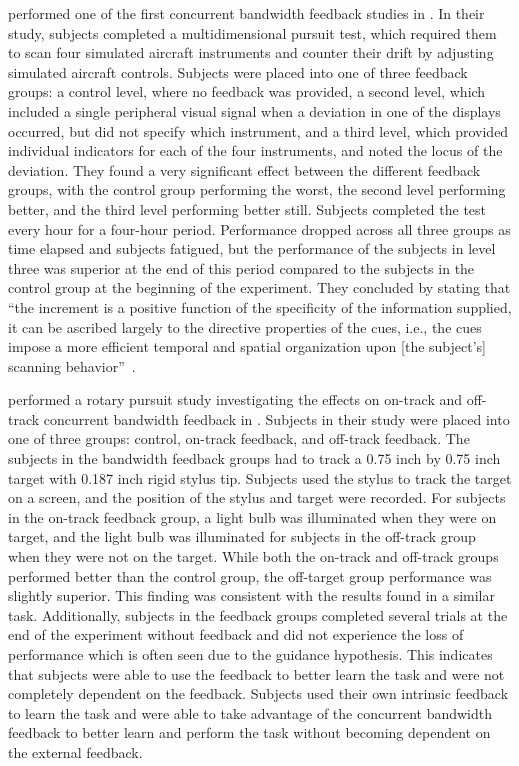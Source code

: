 \citeauthor{payne_effect_1955} performed one of the first concurrent bandwidth feedback studies in \citeyear{payne_effect_1955}.
In their study, subjects completed a multidimensional pursuit test, which required them to scan four simulated aircraft instruments and counter their drift by adjusting simulated aircraft controls.
Subjects were placed into one of three feedback groups: a control level, where no feedback was provided, a second level, which included a single peripheral visual signal when a deviation in one of the displays occurred, but did not specify which instrument, and a third level, which provided individual indicators for each of the four instruments, and noted the locus of the deviation.
They found a very significant effect between the different feedback groups, with the control group performing the worst, the second level performing better, and the third level performing better still.
Subjects completed the test every hour for a four-hour period.
Performance dropped across all three groups as time elapsed and subjects fatigued, but the performance of the subjects in level three was superior at the end of this period compared to the subjects in the control group at the beginning of the experiment.
They concluded by stating that ``the increment is a positive function of the specificity of the information supplied, it can be ascribed largely to the directive properties of the cues, i.e., the cues impose a more efficient temporal and spatial organization upon [the subject's] scanning behavior''~\citep{payne_effect_1955}.

\citeauthor{gordon_effect_1967} performed a rotary pursuit study investigating the effects on on-track and off-track concurrent bandwidth feedback in \citeyear{gordon_effect_1967}.
Subjects in their study were placed into one of three groups: control, on-track feedback, and off-track feedback.
The subjects in the bandwidth feedback groups had to track a 0.75 inch by 0.75 inch target with 0.187 inch rigid stylus tip.
Subjects used the stylus to track the target on a screen, and the position of the stylus and target were recorded.
For subjects in the on-track feedback group, a light bulb was illuminated when they were on target, and the light bulb was illuminated for subjects in the off-track group when they were not on the target.
While both the on-track and off-track groups performed better than the control group, the off-target group performance was slightly superior.
This finding was consistent with the results \citeauthor{williams_-target_1962} found in a similar task.
Additionally, subjects in the feedback groups completed several trials at the end of the experiment without feedback and did not experience the loss of performance which is often seen due to the guidance hypothesis.
This indicates that subjects were able to use the feedback to better learn the task and were not completely dependent on the feedback.
Subjects used their own intrinsic feedback to learn the task and were able to take advantage of the concurrent bandwidth feedback to better learn and perform the task without becoming dependent on the external feedback.

